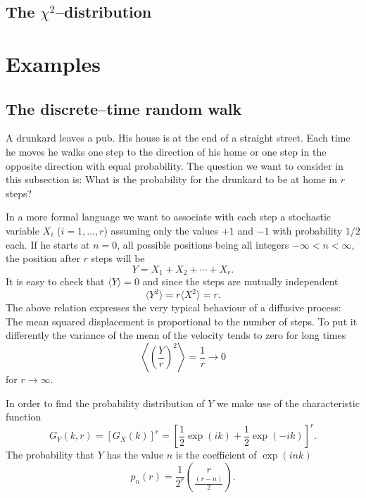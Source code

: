\subsection{The $\chi^2$--distribution}

\section{Examples}

\subsection{The discrete--time random walk}
A drunkard leaves a pub. His house is at the end of a straight
street. Each time  he moves he walks one
step to the direction of his home  or one step in the opposite direction
with equal probability. The question we want to consider in this 
subsection is: What is the probability for the drunkard to be at 
home in $r$ steps? 

In a more formal language we want to associate with each step
a stochastic variable $X_i$ ($i=1,\ldots,r$) assuming only the 
values $+1$ and $-1$ with probability $1/2$ each. If he starts at
$n=0$, all possible positions being all integers $-\infty < n <
\infty$, the position after $r$ steps will be
\begin{equation*}
Y = X_1 + X_2 + \cdots + X_r.
\end{equation*}
It is easy to check that $\langle Y \rangle = 0$ and since
the steps are mutually independent
\begin{equation*}
\langle Y^2 \rangle = r \langle X^2 \rangle = r.
\end{equation*}
The above relation expresses the very typical behaviour of a 
diffusive process: The mean squared displacement is proportional 
to the number of steps. To put it differently the variance of the 
mean of the velocity tends to zero  for long times
\begin{equation*}
\left\langle \left( \frac{Y}{r}\right)^2\right\rangle =
\frac{1}{r} \longrightarrow 0
\end{equation*}
for $r \longrightarrow \infty$.

In order to find the probability distribution of $Y$ we make use
of the characteristic function
\begin{equation*}
G_Y(k,r) = [G_X(k)]^r = [\frac{1}{2}\exp(ik) + 
                   \frac{1}{2}\exp(-ik)]^r.
\end{equation*}
The probability that $Y$ has the value $n$ is the coefficient
of $\exp(ink)$
\begin{equation*}
p_n(r) = \frac{1}{2^r} {r \choose {\frac{(r-n)}{2}}}.
\end{equation*}


